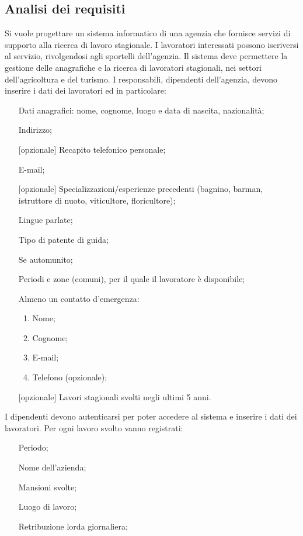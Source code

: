 \documentclass[a4paper,11pt]{article}
\begin{document}
\subsection{Analisi dei requisiti}
Si vuole progettare un sistema informatico di una agenzia che fornisce servizi di supporto alla ricerca di lavoro stagionale. I lavoratori interessati possono iscriversi al servizio, rivolgendosi agli sportelli dell'agenzia. Il sistema deve permettere la gestione delle anagrafiche e la ricerca di lavoratori stagionali, nei settori dell'agricoltura e del turismo.
I responsabili, dipendenti dell'agenzia, devono inserire i dati dei lavoratori ed in particolare:
\begin{itemize}
	\item[\ding{213}] Dati anagrafici: nome, cognome, luogo e data di nascita, nazionalità;
	\item[\ding{213}] Indirizzo;
	\item[\ding{213}] [opzionale] Recapito telefonico personale;
	\item[\ding{213}] E-mail;
	\item[\ding{213}][opzionale] Specializzazioni/esperienze precedenti (bagnino, barman, istruttore di nuoto, viticultore, floricultore);
	\item[\ding{213}] Lingue parlate;
	\item[\ding{213}] Tipo di patente di guida;
	\item[\ding{213}] Se automunito;
	\item[\ding{213}] Periodi e zone (comuni), per il quale il lavoratore è disponibile;
	\item[\ding{213}] Almeno un contatto d'emergenza:
	\begin{enumerate}
		\item Nome;
		\item Cognome;
		\item E-mail;
		\item Telefono (opzionale);
	\end{enumerate}
	\item[\ding{213}] [opzionale] Lavori stagionali svolti negli ultimi 5 anni.
\end{itemize}
I dipendenti devono autenticarsi per poter accedere al sistema e inserire i dati dei lavoratori. Per ogni lavoro svolto vanno registrati:
\begin{itemize}
	\item[\ding{219}] Periodo;
	\item[\ding{219}] Nome dell'azienda;
	\item[\ding{219}] Mansioni svolte;
	\item[\ding{219}] Luogo di lavoro;
	\item[\ding{219}] Retribuzione lorda giornaliera;
\end{itemize}
\end{document}
